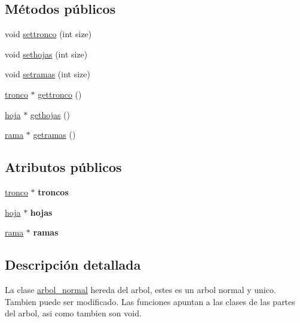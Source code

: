 \subsection*{Métodos públicos}
\begin{DoxyCompactItemize}
\item 
void \hyperlink{classarbol__normal_a6f761bf112224d0478b63935a591d91c}{settronco} (int size)
\item 
void \hyperlink{classarbol__normal_a21fb8efde2259a78b694a81ecb543a07}{sethojas} (int size)
\item 
void \hyperlink{classarbol__normal_a48dbb830f192cf75d87adb80ec23ea7d}{setramas} (int size)
\item 
\hyperlink{classtronco}{tronco} $\ast$ \hyperlink{classarbol__normal_a24fdce164b50a74414b6a3d5ad4e99f6}{gettronco} ()
\item 
\hyperlink{classhoja}{hoja} $\ast$ \hyperlink{classarbol__normal_a999f324b73ff973d4b5b49e2403c637b}{gethojas} ()
\item 
\hyperlink{classrama}{rama} $\ast$ \hyperlink{classarbol__normal_a34c202fa845954e82719d3e86a5a0d9e}{getramas} ()
\end{DoxyCompactItemize}
\subsection*{Atributos públicos}
\begin{DoxyCompactItemize}
\item 
\mbox{\label{classarbol__normal_adcb741c6f4ed4ec3d6fb5a2b3df936ca}} 
\hyperlink{classtronco}{tronco} $\ast$ {\bfseries troncos}
\item 
\mbox{\label{classarbol__normal_a4f210ae92daf183b8f703600853827aa}} 
\hyperlink{classhoja}{hoja} $\ast$ {\bfseries hojas}
\item 
\mbox{\label{classarbol__normal_a238920cdedd1261bcc372cd9b68e8086}} 
\hyperlink{classrama}{rama} $\ast$ {\bfseries ramas}
\end{DoxyCompactItemize}


\subsection{Descripción detallada}
La clase \hyperlink{classarbol__normal}{arbol\+\_\+normal} hereda del arbol, estes es un arbol normal y unico. Tambien puede ser modificado.  Las funciones apuntan a las clases de las partes del arbol, asi como tambien son void. 

